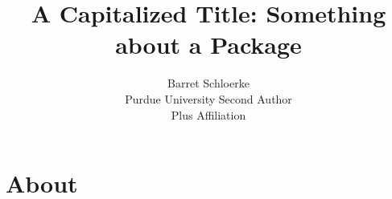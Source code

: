 \documentclass[article]{jss}
\author{Barret Schloerke\\Purdue University \And
        Second Author\\Plus Affiliation}
\title{A Capitalized Title: Something about a Package \pkg{GGally}}
\begin{document}

\section[About Java]{About }
\end{document}
